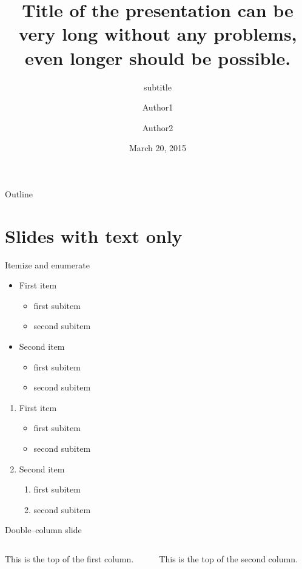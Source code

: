 \documentclass[11pt,t]{beamer}
\title{Title of the presentation can be very long without any problems, even longer should be possible.}
\subtitle{subtitle}
\author{Author1\inst{1} \and Author2\inst{2}}
\institute{
	\inst{1}Institute 1
	\and
	\inst{2}Institute 2
}
\date{March 20, 2015}
\begin{document}
	{
	\begin{frame}
		\titlepage
	\end{frame}
	}
\begin{frame}{Outline}
	\vskip 5mm
	\hfill	{\large \parbox{.95\textwidth}{\tableofcontents[hideallsubsections]}}
\end{frame}

\section{Slides with text only}
\begin{frame}{Itemize and enumerate}
	\begin{itemize}
		\item First item
			\begin{itemize}
				\item first subitem
				\item second subitem
			\end{itemize}
		\item Second item
			\begin{itemize}
				\item first subitem
				\item second subitem
			\end{itemize}
	\end{itemize}
	
	\begin{enumerate}
		\item First item
			\begin{itemize}
				\item first subitem
				\item second subitem
			\end{itemize}
		\item Second item
			\begin{enumerate}
				\item first subitem
				\item second subitem
			\end{enumerate}
	\end{enumerate}
\end{frame}
\begin{frame}[t]{Double--column slide}
	\begin{columns}[t]
		\begin{column}{.5\textwidth}
			This is the top of the first column.	
		\end{column}
		\begin{column}{.5\textwidth}
			This is the top of the second column.
		\end{column}
	\end{columns}	
\end{frame}
\end{document}
